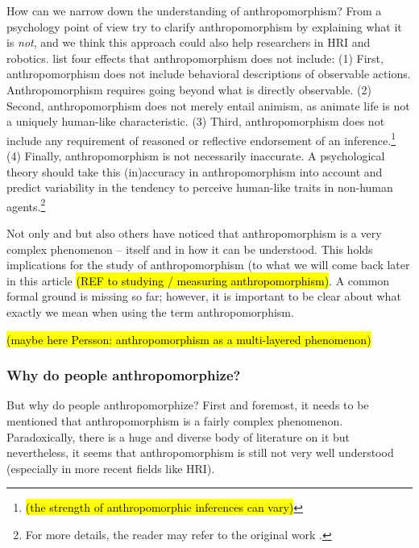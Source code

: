 \documentclass{frontiersSCNS} %
\begin{document}
How can we narrow down the understanding of anthropomorphism? From a psychology point of view \cite{epley_when_2008} try to clarify anthropomorphism by explaining what it is \textit{not}, and we think this approach could also help researchers in HRI and robotics. \cite{epley_when_2008} list four effects that anthropomorphism does not include:
(1) First, anthropomorphism does not include behavioral descriptions of observable actions. Anthropomorphism requires going beyond what is directly observable.
(2) Second, anthropomorphism does not merely entail animism, as animate life is not a uniquely human-like characteristic.
(3) Third, anthropomorphism does not include any requirement of reasoned or reflective endorsement of an inference.\footnote{\hl{(the strength of anthropomorphic inferences can vary)}}
(4) Finally, anthropomorphism is not necessarily inaccurate. A psychological theory should take this (in)accuracy in anthropomorphism into account and predict variability in the tendency to perceive human-like traits in non-human agents.\footnote{For more details, the reader may refer to the original work \citep{epley_when_2008}.}

Not only \cite{epley_when_2008} and \cite{duffy_anthropomorphism_2002} but also others have noticed that anthropomorphism is a very complex phenomenon -- itself and in how it can be understood. This holds implications for the study of anthropomorphism (to what we will come back later in this article \hl{(REF to studying / measuring anthropomorphism)}.
A common formal ground is missing so far; however, it is important to be clear about what exactly we mean when using the term anthropomorphism.

\hl{(maybe here Persson: anthropomorphism as a multi-layered phenomenon)}


%
%
%
%
%
%

\subsubsection{Why do people anthropomorphize?\\}
\label{sec:explanations}

But why do people anthropomorphize? First and foremost, it needs to be mentioned that anthropomorphism is a fairly complex phenomenon. Paradoxically, there is a huge and diverse body of literature on it but nevertheless, it seems that anthropomorphism is still not very well understood (especially in more recent fields like HRI).
\end{document}
